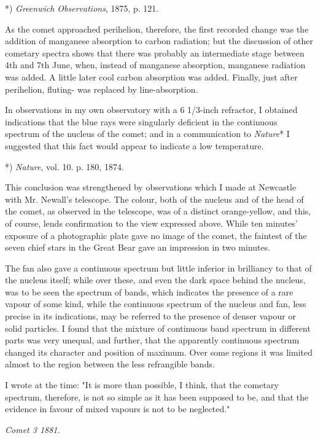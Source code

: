 \documentclass[a4paper, 12pt, oneside, polutonikogreek, english]{article}
\begin{document}
*) \emph{Greenwich Observations}, 1875, p. 121.

As the comet approached perihelion, therefore, the first recorded change was the addition of manganese absorption to carbon radiation; but the discussion of other cometary spectra shows that there was probably an intermediate stage between 4th and 7th June, when, instead of manganese absorption, manganese radiation was added. A little later cool carbon absorption was added. Finally, just after perihelion, fluting- was replaced by line-absorption.

In observations in my own observatory with a 6 1/3-inch refractor, I obtained indications that the blue rays were singularly deficient in the continuous spectrum of the nucleus of the comet; and in a communication to \emph{Nature}* I suggested that this fact would appear to indicate a low temperature.

*) \emph{Nature}, vol. 10. p. 180, 1874.

This conclusion was strengthened by observations which I made at Newcastle with Mr. Newall's telescope. The colour, both of the nucleus and of the head of the comet, as observed in the telescope, was of a distinct orange-yellow, and this, of course, lends confirmation to the view expressed above. While ten minutes' exposure of a photographic plate gave no image of the comet, the faintest of the seven chief stars in the Great Bear gave an impression in two minutes.

The fan also gave a continuous spectrum but little inferior in brilliancy to that of the nucleus itself; while over these, and even the dark space behind the nucleus, was to be seen the spectrum of bands, which indicates the presence of a rare vapour of some kind, while the continuous spectrum of the nucleus and fan, less precise in its indications, may be referred to the presence of denser vapour or solid particles. I found that the mixture of continuous band spectrum in different parts was very unequal, and further, that the apparently continuous spectrum changed its character and position of maximum. Over some regions it was limited almost to the region between the less refrangible bands.

I wrote at the time: "It is more than possible, I think, that the cometary spectrum, therefore, is not so simple as it has been supposed to be, and that the evidence in favour of mixed vapours is not to be neglected."

\emph{Comet 3 1881.}
\end{document}
